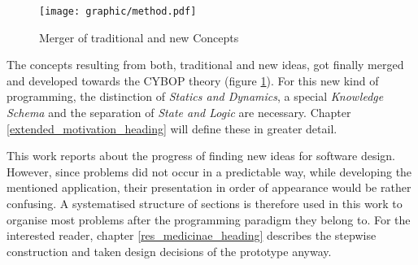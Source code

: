 \begin{figure}[ht]
    \begin{center}
        \texttt{[image: graphic/method.pdf]}
        \caption{Merger of traditional and new Concepts}
        \label{method_figure}
    \end{center}
\end{figure}

The concepts resulting from both, traditional and new ideas, got finally merged
and developed towards the CYBOP theory (figure \ref{method_figure}). For this
new kind of programming, the distinction of \emph{Statics and Dynamics}, a
special \emph{Knowledge Schema} and the separation of \emph{State and Logic}
are necessary. Chapter \ref{extended_motivation_heading} will define these in
greater detail.

This work reports about the progress of finding new ideas for software design.
However, since problems did not occur in a predictable way, while developing
the mentioned application, their presentation in order of appearance would be
rather confusing. A systematised structure of sections is therefore used in
this work to organise most problems after the programming paradigm they belong
to. For the interested reader, chapter \ref{res_medicinae_heading} describes
the stepwise construction and taken design decisions of the prototype anyway.
